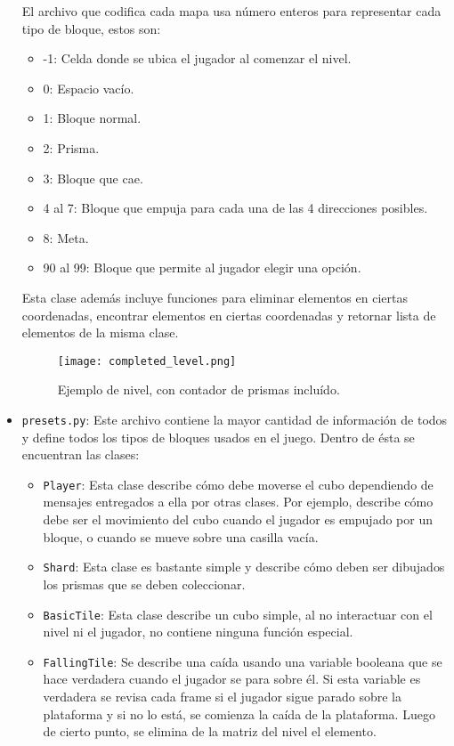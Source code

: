 \documentclass[letterpaper,11pt]{article} %
\begin{document}
\begin{itemize}
		El archivo que codifica cada mapa usa número enteros para representar cada tipo de bloque, estos son:
		\begin{itemize}
			\item -1: Celda donde se ubica el jugador al comenzar el nivel.
			\item 0: Espacio vacío.
			\item 1: Bloque normal.
			\item 2: Prisma.
			\item 3: Bloque que cae.
			\item 4 al 7: Bloque que empuja para cada una de las 4 direcciones posibles.
			\item 8: Meta.
			\item 90 al 99: Bloque que permite al jugador elegir una opción. 
		\end{itemize}
		Esta clase además incluye funciones para eliminar elementos en ciertas coordenadas, encontrar elementos en ciertas coordenadas y retornar lista de elementos de la misma clase.
		\begin{figure}
			\centering
			\texttt{[image: completed\_level.png]}
			\caption{Ejemplo de nivel, con contador de prismas incluído.}
		\end{figure}
		\item \verb!presets.py!: 
		Este archivo contiene la mayor cantidad de información de todos y define todos los tipos de bloques usados en el juego. Dentro de ésta se encuentran las clases:
		\begin{itemize}
			\item \verb!Player!:
			Esta clase describe cómo debe moverse el cubo dependiendo de mensajes entregados a ella por otras clases. Por ejemplo, describe cómo debe ser el movimiento del cubo cuando el jugador es empujado por un bloque, o cuando se mueve sobre una casilla vacía.
			\item \verb!Shard!:
			Esta clase es bastante simple y describe cómo deben ser dibujados los prismas que se deben coleccionar.
			\item \verb!BasicTile!:
			Esta clase describe un cubo simple, al no interactuar con el nivel ni el jugador, no contiene ninguna función especial.
			\item \verb!FallingTile!:
			Se describe una caída usando una variable booleana que se hace verdadera cuando el jugador se para sobre él. Si esta variable es verdadera se revisa cada frame si el jugador sigue parado sobre la plataforma y si no lo está, se comienza la caída de la plataforma. Luego de cierto punto, se elimina de la matriz del nivel el elemento.

\end{itemize}
\end{itemize}
\end{document}
